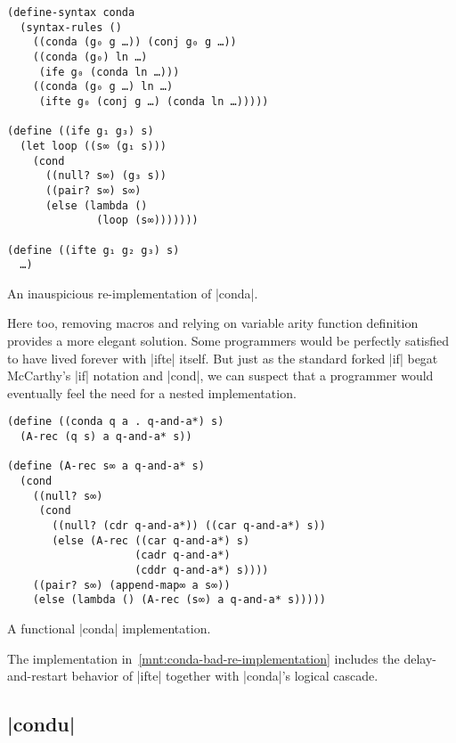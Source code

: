 \documentclass[sigplan,screen,draft,anonymous,review,natbib=false]{acmart}
\begin{document}
\begin{listing}
  \begin{verbatim}
(define-syntax conda
  (syntax-rules ()
    ((conda (g₀ g …)) (conj g₀ g …))
    ((conda (g₀) ln …)
     (ife g₀ (conda ln …)))
    ((conda (g₀ g …) ln …)
     (ifte g₀ (conj g …) (conda ln …)))))

(define ((ife g₁ g₃) s)
  (let loop ((s∞ (g₁ s)))
    (cond
      ((null? s∞) (g₃ s))
      ((pair? s∞) s∞)
      (else (lambda ()
              (loop (s∞)))))))

(define ((ifte g₁ g₂ g₃) s)
  …)
  \end{verbatim}
  \caption{An inauspicious re-implementation of \rackinline|conda|.}
  \label{mnt:conda-bad-re-implementation}
\end{listing}

Here too, removing macros and relying on variable arity function
definition provides a more elegant solution. Some programmers would be
perfectly satisfied to have lived forever with \rackinline|ifte|
itself. But just as the standard forked \rackinline|if| begat
McCarthy's \rackinline|if| notation and \rackinline|cond|, we can
suspect that a programmer would eventually feel the need for a nested
implementation.

\begin{listing}
  \begin{verbatim}
(define ((conda q a . q-and-a*) s)
  (A-rec (q s) a q-and-a* s))

(define (A-rec s∞ a q-and-a* s)
  (cond
    ((null? s∞)
     (cond
       ((null? (cdr q-and-a*)) ((car q-and-a*) s))
       (else (A-rec ((car q-and-a*) s)
                    (cadr q-and-a*)
                    (cddr q-and-a*) s))))
    ((pair? s∞) (append-map∞ a s∞))
    (else (lambda () (A-rec (s∞) a q-and-a* s)))))
  \end{verbatim}
  \caption{A functional \rackinline|conda| implementation.}
  \label{mnt:conda-good-re-implementation}
\end{listing}

The implementation in~\cref{mnt:conda-bad-re-implementation} includes
the delay-and-restart behavior of \rackinline|ifte| together with
\rackinline|conda|'s logical cascade.

\subsection{\rackinline|condu|}
\end{document}
